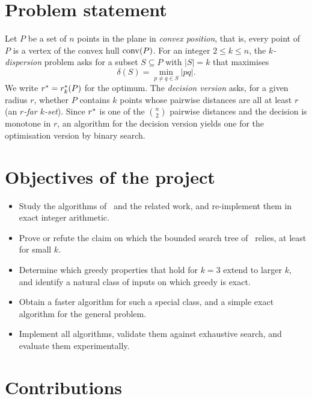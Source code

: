 \section{Problem statement}\label{sec:problem}

Let $P$ be a set of $n$ points in the plane in \emph{convex position}, that is,
every point of $P$ is a vertex of the convex hull $\mathrm{conv}(P)$. For an integer
$2\le k\le n$, the \emph{$k$-dispersion} problem asks for a subset
$S\subseteq P$ with $|S|=k$ that maximises
\[
  \delta(S)=\min_{p\ne q\in S}|pq| .
\]
We write $r^{*}=r^{*}_k(P)$ for the optimum. The \emph{decision version}
asks, for a given radius $r$, whether $P$ contains $k$ points whose pairwise
distances are all at least $r$ (an \emph{$r$-far $k$-set}). Since $r^{*}$ is
one of the $\binom n2$ pairwise distances and the decision is monotone in $r$,
an algorithm for the decision version yields one for the optimisation version
by binary search.

\section{Objectives of the project}

\begin{itemize}[leftmargin=*,itemsep=2pt]
\item Study the algorithms of~\citet{sbm} and the related work, and re-implement
them in exact integer arithmetic.
\item Prove or refute the claim on which the bounded search tree of~\citet{sbm}
relies, at least for small $k$.
\item Determine which greedy properties that hold for $k=3$ extend to larger
$k$, and identify a natural class of inputs on which greedy is exact.
\item Obtain a faster algorithm for such a special class, and a simple exact
algorithm for the general problem.
\item Implement all algorithms, validate them against exhaustive search, and
evaluate them experimentally.
\end{itemize}

\section{Contributions}\label{sec:contributions}

